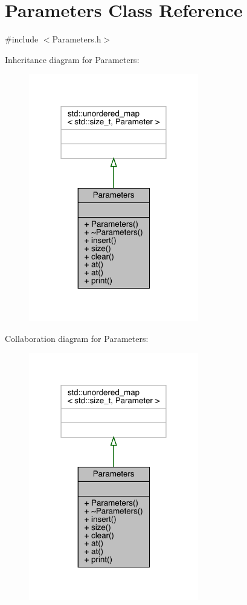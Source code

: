 \hypertarget{class_parameters}{}\section{Parameters Class Reference}
\label{class_parameters}


{\ttfamily \#include $<$Parameters.\+h$>$}



Inheritance diagram for Parameters\+:\nopagebreak
\begin{figure}[H]
\begin{center}
\leavevmode
\includegraphics[width=210pt]{class_parameters__inherit__graph}
\end{center}
\end{figure}


Collaboration diagram for Parameters\+:\nopagebreak
\begin{figure}[H]
\begin{center}
\leavevmode
\includegraphics[width=210pt]{class_parameters__coll__graph}
\end{center}
\end{figure}

